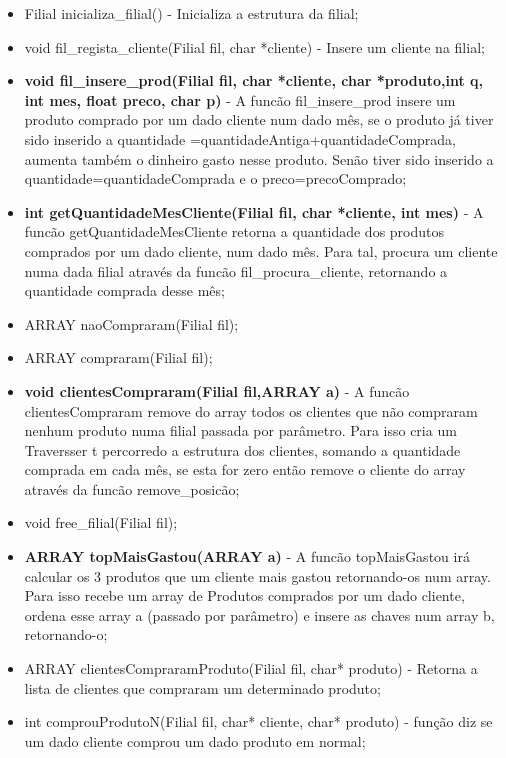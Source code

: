 \begin{itemize}
\item	Filial inicializa\_filial() - Inicializa a estrutura da filial; 

\item	void fil\_regista\_cliente(Filial fil, char *cliente) - Insere um cliente na filial; 

\item 	\textbf{void fil\_insere\_prod(Filial fil, char *cliente, char *produto,int q, int mes, float preco, char p)} - A funcão fil\_insere\_prod insere  um produto comprado por um dado cliente num dado mês, se o produto já tiver sido inserido a quantidade =quantidadeAntiga+quantidadeComprada, aumenta também o dinheiro gasto nesse produto. Senão tiver sido inserido a quantidade=quantidadeComprada e o 
preco=precoComprado; 
 
\item	\textbf{int getQuantidadeMesCliente(Filial fil, char *cliente, int mes)} - A funcão getQuantidadeMesCliente retorna a quantidade dos produtos comprados por um dado cliente, num dado mês. Para tal, procura um cliente numa dada filial através da funcão fil\_procura\_cliente, retornando a quantidade comprada  desse mês; 

\item	ARRAY naoCompraram(Filial fil);
\item	ARRAY compraram(Filial fil);
\item	\textbf{void clientesCompraram(Filial fil,ARRAY a)} - A funcão clientesCompraram remove do array todos os clientes que não compraram nenhum produto numa filial passada por parâmetro. Para isso cria um Traversser t percorredo a estrutura dos clientes, somando a quantidade comprada em cada mês, se esta for zero então remove o cliente do array através da funcão remove\_posicão; 
\item	void free\_filial(Filial fil);
\item	\textbf{ARRAY topMaisGastou(ARRAY a)} - A funcão topMaisGastou irá calcular os 3 produtos que um cliente mais gastou retornando-os num array. Para isso recebe um array de Produtos comprados por um dado cliente, ordena esse array a (passado por parâmetro) e insere as chaves num array b, retornando-o; 
\item	ARRAY clientesCompraramProduto(Filial fil, char* produto) - Retorna a lista de clientes que compraram um determinado produto; 

\item	int comprouProdutoN(Filial fil, char* cliente, char* produto) - função  diz se um dado cliente comprou um dado produto em normal;


\end{itemize}
